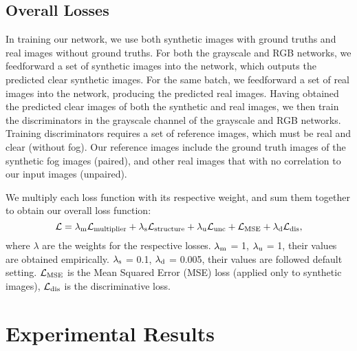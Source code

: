 \documentclass[runningheads]{llncs}
\begin{document}
\subsection{Overall Losses}
In training our network, we use both synthetic images with ground truths and real images without ground truths. 
For both the grayscale and RGB networks, we feedforward a set of synthetic images into the network, which outputs the predicted clear synthetic images.
For the same batch, we feedforward a set of real images into the network, producing the predicted real images.
Having obtained the predicted clear images of both the synthetic and real images, we then train the discriminators in the grayscale channel of the grayscale and RGB networks.
Training discriminators requires a set of reference images, which must be real and clear (without fog).
Our reference images include the ground truth images of the synthetic fog images (paired), and other real images that with no correlation to our input images (unpaired).

We multiply each loss function with its respective weight, and sum them together to obtain our overall loss function: 
\begin{equation}
\mathcal{L} = \lambda_{\rm m} \mathcal{L}_{\rm multiplier} + \lambda_{\rm s} \mathcal{L}_{\rm structure} + \lambda_{\rm u} \mathcal{L}_{\rm unc} +
\mathcal{L}_{\rm MSE} + \lambda_{\rm d} \mathcal{L}_{\rm dis}, 
\label{eq:losses_more}
\end{equation}
where $\lambda$ are the weights for the respective losses. 
$\lambda_{\rm m}$ = 1, $\lambda_{\rm u}$ = 1, their values are obtained empirically.
$\lambda_{\rm s}$ = 0.1, $\lambda_{\rm d}$ = 0.005, their values are followed default setting. 
$\mathcal{L}_{\rm MSE}$ is the Mean Squared Error (MSE) loss (applied only to synthetic images), 
$\mathcal{L}_{\rm dis}$ is the discriminative loss.

\section{Experimental Results}
\label{sec:exp}
\end{document}
